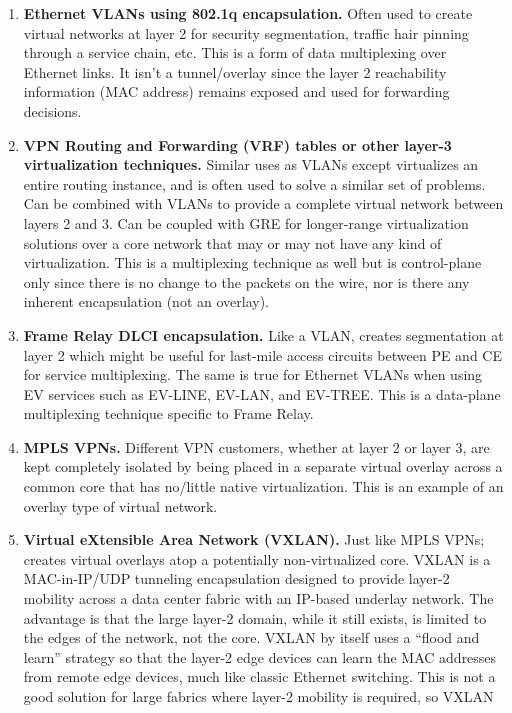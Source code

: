 \begin{enumerate}
  \item \textbf{Ethernet VLANs using 802.1q encapsulation.} Often used to create
  virtual networks at layer 2 for security segmentation, traffic hair pinning
  through a service chain, etc. This is a form of data multiplexing over
  Ethernet links. It isn’t a tunnel/overlay since the layer 2 reachability
  information (MAC address) remains exposed and used for forwarding decisions.
  \item \textbf{VPN Routing and Forwarding (VRF) tables or other layer-3
  virtualization techniques.} Similar uses as VLANs except virtualizes an
  entire routing instance, and is often used to solve a similar set of
  problems. Can be combined with VLANs to provide a complete virtual network
  between layers 2 and 3. Can be coupled with GRE for longer-range
  virtualization solutions over a core network that may or may not have any
  kind of virtualization. This is a multiplexing technique as well but is
  control-plane only since there is no change to the packets on the wire, nor
  is there any inherent encapsulation (not an overlay).
  \item \textbf{Frame Relay DLCI encapsulation.} Like a VLAN, creates segmentation
  at layer 2 which might be useful for last-mile access circuits between PE and
  CE for service multiplexing. The same is true for Ethernet VLANs when using
  EV services such as EV-LINE, EV-LAN, and EV-TREE. This is a data-plane
  multiplexing technique specific to Frame Relay.
  \item \textbf{MPLS VPNs.} Different VPN customers, whether at layer 2 or layer 3,
  are kept completely isolated by being placed in a separate virtual overlay
  across a common core that has no/little native virtualization. This is an
  example of an overlay type of virtual network.
  \item \textbf{Virtual eXtensible Area Network (VXLAN).} Just like MPLS VPNs;
  creates virtual overlays atop a potentially non-virtualized core. VXLAN is a
  MAC-in-IP/UDP tunneling encapsulation designed to provide layer-2 mobility
  across a data center fabric with an IP-based underlay network. The advantage
  is that the large layer-2 domain, while it still exists, is limited to the
  edges of the network, not the core. VXLAN by itself uses a ``flood and learn''
  strategy so that the layer-2 edge devices can learn the MAC addresses from
  remote edge devices, much like classic Ethernet switching. This is not a
  good solution for large fabrics where layer-2 mobility is required, so VXLAN

\end{enumerate}

